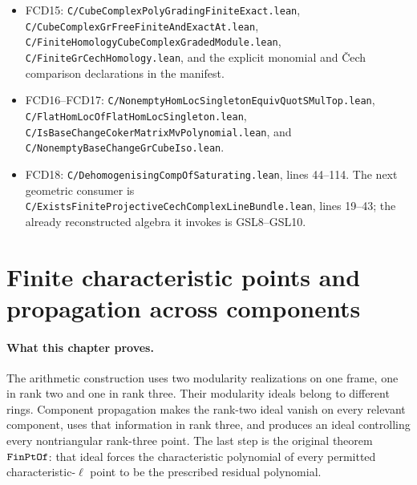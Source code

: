 \documentclass[11pt,a4paper]{article}
\numberwithin{equation}{section}
\theoremstyle{remark}\newtheorem{remark}[theorem]{Remark}
\begin{document}
\begin{itemize}
\texttt{C/\allowbreak{}Dehomogenising\allowbreak{}Eq\allowbreak{}Zero\allowbreak{}Iff.lean},
\texttt{C/\allowbreak{}Finite\allowbreak{}Quot\allowbreak{}SMul\allowbreak{}Top\allowbreak{}XSub\allowbreak{}One\allowbreak{}Of\allowbreak{}Chart.lean}, and
\texttt{C/\allowbreak{}Dehomogenising\allowbreak{}Comp\allowbreak{}Of\allowbreak{}Saturating.lean}, lines 22--42.
\item FCD15:
\texttt{C/\allowbreak{}Cube\allowbreak{}Complex\allowbreak{}Poly\allowbreak{}Grading\allowbreak{}Finite\allowbreak{}Exact.lean},
\texttt{C/\allowbreak{}Cube\allowbreak{}Complex\allowbreak{}Gr\allowbreak{}Free\allowbreak{}Finite\allowbreak{}And\allowbreak{}Exact\allowbreak{}At.lean},
\texttt{C/\allowbreak{}Finite\allowbreak{}Homology\allowbreak{}Cube\allowbreak{}Complex\allowbreak{}Graded\allowbreak{}Module.lean},
\texttt{C/\allowbreak{}Finite\allowbreak{}Gr\allowbreak{}Cech\allowbreak{}Homology.lean}, and the explicit monomial
and \v Cech comparison declarations in the manifest.
\item FCD16--FCD17:
\texttt{C/\allowbreak{}Nonempty\allowbreak{}Hom\allowbreak{}Loc\allowbreak{}Singleton\allowbreak{}Equiv\allowbreak{}Quot\allowbreak{}SMul\allowbreak{}Top.lean},
\texttt{C/\allowbreak{}Flat\allowbreak{}Hom\allowbreak{}Loc\allowbreak{}Of\allowbreak{}Flat\allowbreak{}Hom\allowbreak{}Loc\allowbreak{}Singleton.lean},
\texttt{C/\allowbreak{}Is\allowbreak{}Base\allowbreak{}Change\allowbreak{}Coker\allowbreak{}Matrix\allowbreak{}Mv\allowbreak{}Polynomial.lean}, and
\texttt{C/\allowbreak{}Nonempty\allowbreak{}Base\allowbreak{}Change\allowbreak{}Gr\allowbreak{}Cube\allowbreak{}Iso.lean}.
\item FCD18:
\texttt{C/\allowbreak{}Dehomogenising\allowbreak{}Comp\allowbreak{}Of\allowbreak{}Saturating.lean}, lines 44--114.
The next geometric consumer is
\texttt{C/\allowbreak{}Exists\allowbreak{}Finite\allowbreak{}Projective\allowbreak{}Cech\allowbreak{}Complex\allowbreak{}Line\allowbreak{}Bundle.lean},
lines 19--43; the already reconstructed algebra it invokes is
GSL8--GSL10.
\end{itemize}


\section{Finite characteristic points and propagation across components}
\label{sec:arithmetic-component-propagation}

\paragraph{What this chapter proves.}
The arithmetic construction uses two modularity realizations on one
frame, one in rank two and one in rank three.  Their modularity ideals
belong to different rings.  Component propagation makes the rank-two
ideal vanish on every relevant component, uses that information in
rank three, and produces an ideal controlling every nontriangular
rank-three point.  The last step is the original theorem
\(\texttt{Fin\allowbreak Pt\allowbreak Of}\): that ideal forces the characteristic polynomial
of every permitted characteristic-\(\ell\) point to be the prescribed
residual polynomial.
\end{document}

